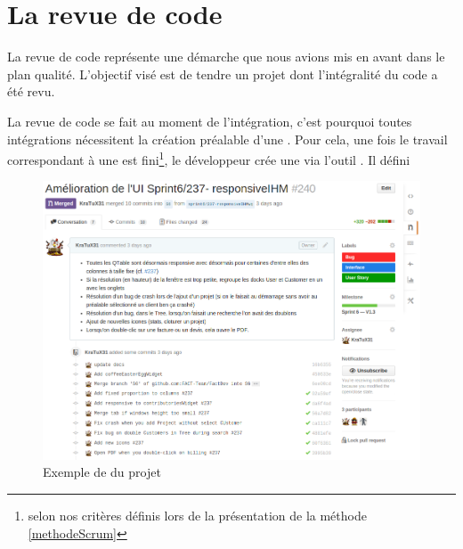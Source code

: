 \section{La revue de code}
La revue de code représente une démarche que nous avions mis en avant dans le plan qualité. L'objectif visé est de tendre un projet dont l'intégralité du code a été revu. 

La revue de code se fait au moment de l'intégration, c'est pourquoi toutes intégrations nécessitent la création préalable d'une \PullRequest. Pour cela, une fois le travail correspondant à une \UserStory{} est fini\footnote{selon nos critères définis lors de la présentation de la méthode \Scrum{} \ref{methodeScrum}}, le développeur crée une \PullRequest{} via l'outil \Github. Il défini
\begin{figure}
	\centering
	\includegraphics[width=0.7\linewidth]{screens/creation_pr_github}
	\caption{Exemple de \PullRequest{} du projet \FactDev}
	\label{fig:creation_pr_github}
\end{figure}

